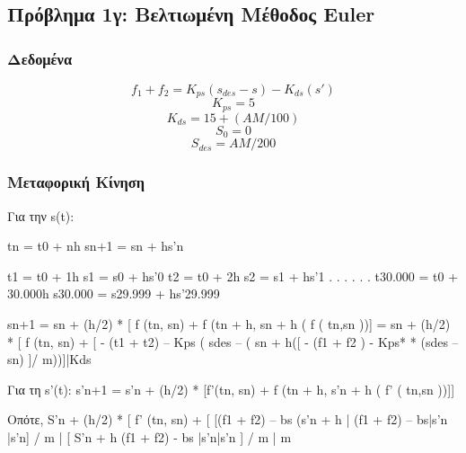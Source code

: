 \documentclass[a4paper]{article}
\begin{document}



        \subsection{Πρόβλημα 1γ: Βελτιωμένη Μέθοδος Euler}

        \subsubsection{Δεδομένα}

        \[f_1 + f_2 = K_{ps}(s_{des} - s) - K_{ds}(s')\]
        \[K_{ps} = 5\]
        \[K_{ds} = 15 + (AM/ 100)\]
        \[S_0 =0\]
        \[S_{des} = AM / 200\]

        \subsubsection{Μεταφορική Κίνηση}   
            Για την s(t):

        tn = t0 + nh					sn+1 = sn  + hs’n

        t1 = t0  + 1h					   s1    = s0  + hs’0
        t2 = t0  + 2h					   s2    = s1  + hs’1
            .						     .
            .						     .
            .						     .
        t30.000 = t0 + 30.000h			     s30.000 = s29.999 + hs’29.999




        sn+1 = sn + (h/2) * [ f (tn, sn) + f (tn + h, sn + h (  f (  tn,sn ))]
                = sn  + (h/2) * [ f (tn, sn) + [ - (t1 + t2) – Kps ( sdes – ( sn + h([ - (f1 + f2 ) - Kps*              
                                                                                                * (sdes – sn) ]/ m))]|Kds

        Για τη s’(t):
        s’n+1 = s’n + (h/2) * [f’(tn, sn) + f (tn + h, s’n + h (  f’ (  tn,sn ))]]

        Οπότε,
        S’n  + (h/2) * [  f’  (tn, sn) + [ [(f1 + f2) – bs (s’n + h  |  (f1 + f2) – bs|s’n |s’n]  /  m  |  [ S’n + h (f1 + f2)  - bs |s’n|s’n ] / m  |  m 
\end{document}
